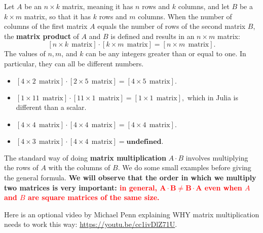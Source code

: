 Let $A$ be an $n \times k$ matrix, meaning it has $n$ rows and $k$ columns, and let $B$ be a $k \times m$ matrix, so that it has $k$ rows and $m$ columns. When the number of columns of the first matrix $A$ equals the number of rows of the second matrix $B$, the \textbf{matrix product} of $A$ and $B$ is defined and results in an $n \times m$ matrix:
$$[n\times k~~\text{matrix}] \cdot [k \times m~~\text{matrix}] = [n \times m~~\text{matrix}].$$
The values of $n, m$, and $k$ can be any integers greater than or equal to one. In particular, they can all be different numbers.


\begin{tcolorbox}

\begin{itemize}
    \item $[4\times 2~~\text{matrix}] \cdot [2 \times 5~~\text{matrix}] = [4 \times 5~~\text{matrix}].$
        \item $[1\times 11~~\text{matrix}] \cdot [11 \times 1~~\text{matrix}] = [1 \times 1~~\text{matrix}],$ which in Julia is different than a scalar.
            \item $[4\times 4~~\text{matrix}] \cdot [4 \times 4~~\text{matrix}] = [4 \times 4~~\text{matrix}].$
                        \item $[4\times 3~~\text{matrix}] \cdot [4 \times 4~~\text{matrix}] = \textbf{undefined}.$
\end{itemize}
\end{tcolorbox}

\begin{tcolorbox}[sharp corners, colback=green!30, colframe=green!80!blue, title=\textbf{\large Matrix multiplication using rows of $A$ and columns of $B$}]
The standard way of doing \textbf{matrix multiplication} $A \cdot B$ involves multiplying the rows of $A$ with the columns of $B$. We do some small examples before giving the general formula. \textbf{We will observe that the order in which we multiply two matrices is very important: \textcolor{red}{in general, $\mathbf{A \cdot B \neq B \cdot A}$ even when $A$ and $B$ are square matrices of the same size.}}
\end{tcolorbox}

\vspace*{.2cm}

\begin{tcolorbox}[title=\textcolor{red}{\bf \Large Source of the Definition of Matrix Multiplication}]

Here is an optional video by Michael Penn explaining WHY matrix multiplication needs to work this way: \url{https://youtu.be/cc1ivDlZ71U}. 
    
\end{tcolorbox}

